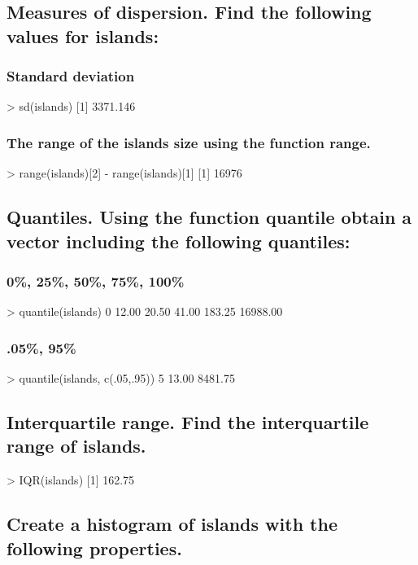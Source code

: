 \documentclass[a4paper,11pt]{article}
\begin{document}
\subsection{Measures of dispersion. Find the following values for islands:}
\subsubsection{Standard deviation}
\begin{rcode}
> sd(islands)
[1] 3371.146
\end{rcode}
\subsubsection{The range of the islands size using the function range.}
\begin{rcode}
> range(islands)[2] - range(islands)[1]
[1] 16976
\end{rcode}
\subsection{Quantiles. Using the function quantile obtain a vector including the following quantiles:}
\subsubsection{0\%, 25\%, 50\%, 75\%, 100\%}
\begin{rcode}
> quantile(islands)
       0%
    12.00    20.50    41.00   183.25 16988.00
\end{rcode}
\subsubsection{.05\%, 95\%}
\begin{rcode}
> quantile(islands, c(.05,.95))
      5%
   13.00 8481.75
\end{rcode}
\subsection{Interquartile range. Find the interquartile range of islands.}
\begin{rcode}
> IQR(islands)
[1] 162.75
\end{rcode}
\subsection{Create a histogram of islands with the following properties.}
\end{document}
